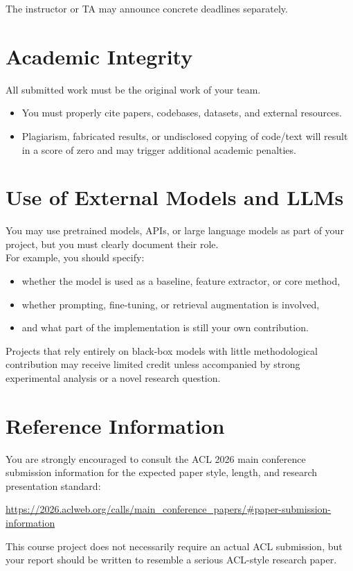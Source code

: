 \documentclass{article}
\begin{document}
\noindent The instructor or TA may announce concrete deadlines separately.

\section{Academic Integrity}

All submitted work must be the original work of your team.

\begin{itemize}
  \item You must properly cite papers, codebases, datasets, and external resources.
  \item Plagiarism, fabricated results, or undisclosed copying of code/text will result in a score of zero and may trigger additional academic penalties.
\end{itemize}

\section{Use of External Models and LLMs}

You may use pretrained models, APIs, or large language models as part of your project,
but you must clearly document their role. \\

\noindent For example, you should specify:
\begin{itemize}
  \item whether the model is used as a baseline, feature extractor, or core method,
  \item whether prompting, fine-tuning, or retrieval augmentation is involved,
  \item and what part of the implementation is still your own contribution.
\end{itemize}

\noindent Projects that rely entirely on black-box models with little methodological contribution
may receive limited credit unless accompanied by strong experimental analysis or a novel research question.

\section{Reference Information}

You are strongly encouraged to consult the ACL 2026 main conference submission information
for the expected paper style, length, and research presentation standard:

\begin{center}
\url{https://2026.aclweb.org/calls/main_conference_papers/#paper-submission-information}
\end{center}

\noindent This course project does not necessarily require an actual ACL submission,
but your report should be written to resemble a serious ACL-style research paper.
\end{document}
